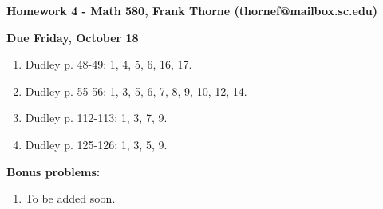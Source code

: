 \documentclass[12pt]{article}
\begin{document}
\setlength{\topmargin}{-2mm}





\begin{center}{\bf Homework 4 - Math 580, Frank Thorne (thornef@mailbox.sc.edu)}
\end{center}
\begin{center}
{\bf Due Friday, October 18}
\end{center}
\begin{enumerate}[(1)]
\item 
Dudley p. 48-49: 1, 4, 5, 6, 16, 17.
\item
Dudley p. 55-56: 1, 3, 5, 6, 7, 8, 9, 10, 12, 14.
\item
Dudley p. 112-113: 1, 3, 7, 9.
\item
Dudley p. 125-126: 1, 3, 5, 9.
\end{enumerate}

{\bf Bonus problems:}
\begin{enumerate}[(1)]
\item
To be added soon.
\end{enumerate}
\end{document}
